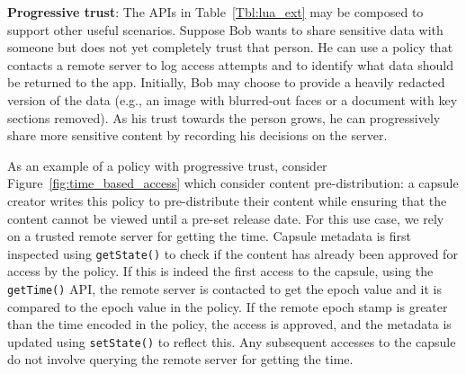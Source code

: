 \textbf{Progressive trust}: The APIs in Table~\ref{Tbl:lua_ext} may be composed
to support other useful scenarios. Suppose Bob wants to share
sensitive data with someone but does not yet completely trust that person. He
can use a policy that contacts a remote server to log access attempts and to
identify what data should be returned to the app. Initially, Bob may choose to
provide a heavily redacted version of the data (e.g., an image with blurred-out
faces or a document with key sections removed). As his trust towards
the person grows, he can progressively share more sensitive content by recording his
decisions on the server.


As an example of a policy with progressive trust, consider
Figure~\ref{fig:time_based_access} which consider content
pre-distribution: a capsule creator writes this policy to
pre-distribute their content while ensuring that the content cannot be
viewed until a pre-set release date. For this use case, we rely on a
trusted remote server for getting the time. Capsule metadata is first
inspected using \texttt{getState()} to check if the content has
already been approved for access by the policy. If this is indeed the
first access to the capsule, using the \texttt{getTime()} API, the
remote server is contacted to get the epoch value and it is compared
to the epoch value in the policy. If the remote epoch stamp is greater
than the time encoded in the policy, the access is approved, and the
metadata is updated using \texttt{setState()} to reflect this. Any
subsequent accesses to the capsule do not involve querying the remote
server for getting the time.


